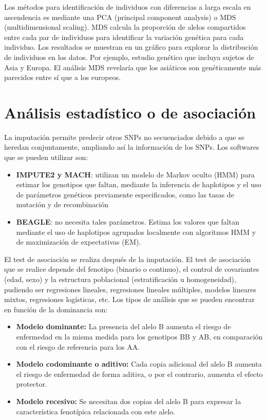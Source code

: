 Los métodos para identificación de individuos con diferencias a larga escala en ascendencia es mediante una PCA (principal component analysis) o MDS (multidimensional scaling). MDS calcula la proporción de alelos compartidos entre cada par de individuos para identificar la variación genética para cada individuo. Los resultados se muestran en un gráfico para explorar la distribución de individuos en los datos. Por ejemplo, estudio genético que incluya sujetos de Asia y Europa. El análisis MDS revelaría que los asiáticos son genéticamente más parecidos entre sí que a los europeos.

\chapter{Análisis estadístico o de asociación}
La imputación permite predecir otros SNPs no secuenciados debido a que se heredan conjuntamente, ampliando así la información de los SNPs. Los softwares que se pueden utilizar son:
\begin{itemize}
\item \textbf{IMPUTE2 y MACH}: utilizan un modelo de Markov oculto (HMM) para estimar los genotipos que faltan, mediante la inferencia de haplotipos y el uso de parámetros genéticos previamente especificados, como las tasas de mutación y de recombinación
\item \textbf{BEAGLE}: no necesita tales parámetros. Estima los valores que faltan mediante el uso de haplotipos agrupados localmente con algoritmos HMM y de maximización de expectativas (EM).
\end{itemize}

El test de asociación se realiza después de la imputación. El test de asociación que se realice depende del fenotipo (binario o continuo), el control de covariantes (edad, sexo) y la estructura poblacional (estratificación u homogeneidad), pudiendo ser regresiones lineales, regresiones lineales múltiples, modelos lineares mixtos, regresiones logísticas, etc. Los tipos de análisis que se pueden encontrar en función de la dominancia son:
\begin{itemize}
\item \textbf{Modelo dominante:} La presencia del alelo B aumenta el riesgo de enfermedad en la misma medida para los genotipos BB y AB, en comparación con el riesgo de referencia para los AA.
\item \textbf{Modelo codominante o aditivo:} Cada copia adicional del alelo B aumenta el riesgo de enfermedad de forma aditiva, o por el contrario, aumenta el efecto protector.
\item \textbf{Modelo recesivo:} Se necesitan dos copias del alelo B para expresar la característica fenotípica relacionada con este alelo.
\end{itemize}

